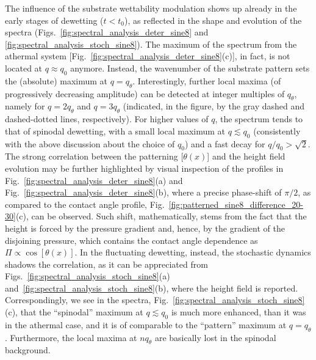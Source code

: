The influence of the substrate wettability modulation shows up already in the early stages of dewetting ($t<t_0$), as reflected in the shape and evolution of the spectra (Figs.~\ref{fig:spectral_analysis_deter_sine8} and \ref{fig:spectral_analysis_stoch_sine8}). 
The maximum of the spectrum from the athermal system [Fig.~\ref{fig:spectral_analysis_deter_sine8}(c)], in fact, is not located at $q \approx q_0$ anymore.
Instead, the wavenumber of the substrate pattern sets the (absolute) maximum at $q=q_{\theta}$. 
Interestingly, further local maxima (of progressively decreasing amplitude) can be detected at integer multiples of $q_{\theta}$, namely for $q=2q_{\theta}$ and $q=3q_{\theta}$ (indicated, in the figure, by the gray dashed and dashed-dotted lines, respectively).
For higher values of $q$, the spectrum tends to that of spinodal dewetting, with a small local maximum at $q \lesssim q_0$ (consistently with the above discussion about the choice of $q_0$) and a fast decay for $q/q_0 > \sqrt{2}$.
The strong correlation between the patterning [$\theta(x)$] and the height field evolution may be further highlighted by visual inspection of the profiles in Fig.~\ref{fig:spectral_analysis_deter_sine8}(a) and Fig.~\ref{fig:spectral_analysis_deter_sine8}(b), where a precise phase-shift of $\pi/2$, as compared to the contact angle profile, Fig.~\ref{fig:patterned_sine8_difference_20-30}(c), can be observed. 
Such shift, mathematically, stems from the fact that the height is forced by the pressure gradient and, hence, by the gradient of the disjoining pressure, which contains the contact angle dependence as $\Pi \propto \cos[\theta(x)]$.
In the fluctuating dewetting, instead, the stochastic dynamics shadows the correlation, as it can be appreciated from Figs.~\ref{fig:spectral_analysis_stoch_sine8}(a) and~\ref{fig:spectral_analysis_stoch_sine8}(b), where the height field is reported. 
Correspondingly, we see in the spectra, Fig.~\ref{fig:spectral_analysis_stoch_sine8}(c), that the ``spinodal'' maximum at $q \lesssim q_0$ is much more enhanced, than it was in the athermal case, and it is of comparable to the ``pattern'' maximum at $q = q_{\theta}$.
Furthermore, the local maxima at $nq_{\theta}$ are basically lost in the spinodal background.

